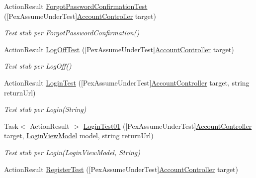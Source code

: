 \begin{DoxyCompactItemize}
Action\+Result \mbox{\hyperlink{class_brew_day2_1_1_controllers_1_1_tests_1_1_account_controller_test_a2b46271e04f8cc19b85b0bbcfa4ae4cd}{Forgot\+Password\+Confirmation\+Test}} (\mbox{[}Pex\+Assume\+Under\+Test\mbox{]}\mbox{\hyperlink{class_brew_day2_1_1_controllers_1_1_account_controller}{Account\+Controller}} target)
\begin{DoxyCompactList}\small\item\em Test stub per Forgot\+Password\+Confirmation()\end{DoxyCompactList}\item 
Action\+Result \mbox{\hyperlink{class_brew_day2_1_1_controllers_1_1_tests_1_1_account_controller_test_a6c25fb50bd70aff1d0ed1fd246eda2a6}{Log\+Off\+Test}} (\mbox{[}Pex\+Assume\+Under\+Test\mbox{]}\mbox{\hyperlink{class_brew_day2_1_1_controllers_1_1_account_controller}{Account\+Controller}} target)
\begin{DoxyCompactList}\small\item\em Test stub per Log\+Off()\end{DoxyCompactList}\item 
Action\+Result \mbox{\hyperlink{class_brew_day2_1_1_controllers_1_1_tests_1_1_account_controller_test_ae6d3cd9f5e2c336f17e7d3ea1f0f9011}{Login\+Test}} (\mbox{[}Pex\+Assume\+Under\+Test\mbox{]}\mbox{\hyperlink{class_brew_day2_1_1_controllers_1_1_account_controller}{Account\+Controller}} target, string return\+Url)
\begin{DoxyCompactList}\small\item\em Test stub per Login(\+String)\end{DoxyCompactList}\item 
Task$<$ Action\+Result $>$ \mbox{\hyperlink{class_brew_day2_1_1_controllers_1_1_tests_1_1_account_controller_test_a0c6750d4dbf7dded606660985bc89594}{Login\+Test01}} (\mbox{[}Pex\+Assume\+Under\+Test\mbox{]}\mbox{\hyperlink{class_brew_day2_1_1_controllers_1_1_account_controller}{Account\+Controller}} target, \mbox{\hyperlink{class_brew_day2_1_1_models_1_1_login_view_model}{Login\+View\+Model}} model, string return\+Url)
\begin{DoxyCompactList}\small\item\em Test stub per Login(\+Login\+View\+Model, String)\end{DoxyCompactList}\item 
Action\+Result \mbox{\hyperlink{class_brew_day2_1_1_controllers_1_1_tests_1_1_account_controller_test_adeff80a3424de05f7c1b44a74160fe92}{Register\+Test}} (\mbox{[}Pex\+Assume\+Under\+Test\mbox{]}\mbox{\hyperlink{class_brew_day2_1_1_controllers_1_1_account_controller}{Account\+Controller}} target)

\end{DoxyCompactItemize}
